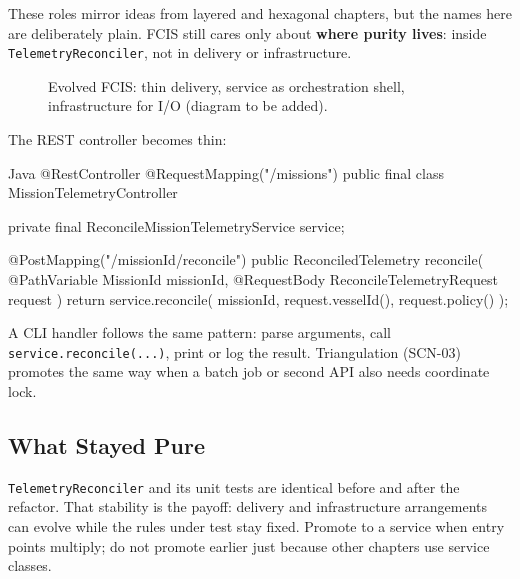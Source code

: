 These roles mirror ideas from layered and hexagonal chapters, but the names here are deliberately plain. FCIS still cares only about \textbf{where purity lives}: inside \texttt{TelemetryReconciler}, not in delivery or infrastructure.

\begin{figure}[htbp]
\centering
{}
\caption{Evolved FCIS: thin delivery, service as orchestration shell, infrastructure for I/O (diagram to be added).}
\label{fig:fcis_evolution_layers}
\end{figure}

The REST controller becomes thin:

\begin{ridercode}{Java}
@RestController
@RequestMapping("/missions")
public final class MissionTelemetryController
{
    private final ReconcileMissionTelemetryService service;

    @PostMapping("/{missionId}/reconcile")
    public ReconciledTelemetry reconcile(
        @PathVariable MissionId missionId,
        @RequestBody ReconcileTelemetryRequest request
    )
    {
        return service.reconcile(
            missionId,
            request.vesselId(),
            request.policy()
        );
    }
}
\end{ridercode}
\label{lst:fcis-reconciliation-controller-thin}

A CLI handler follows the same pattern: parse arguments, call \texttt{service.reconcile(...)}, print or log the result. Triangulation (SCN-03) promotes the same way when a batch job or second API also needs coordinate lock.

\subsection{What Stayed Pure}
\label{sec:fcis_evolution_pure_unchanged}

\texttt{TelemetryReconciler} and its unit tests are identical before and after the refactor. That stability is the payoff: delivery and infrastructure arrangements can evolve while the rules under test stay fixed. Promote to a service when entry points multiply; do not promote earlier just because other chapters use service classes.

